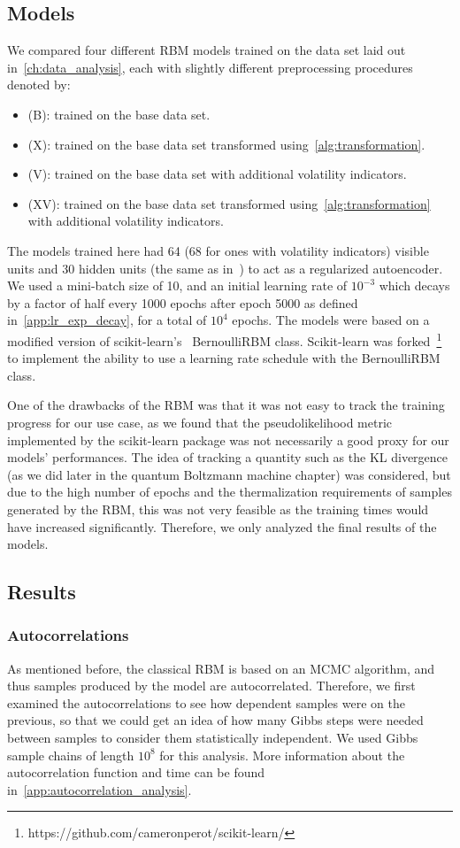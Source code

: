 \subsection{Models}
We compared four different RBM models trained on the data set laid out in~\cref{ch:data_analysis}, each with slightly different preprocessing procedures denoted by:
\begin{itemize}
    \item (B): trained on the base data set.
    \item (X): trained on the base data set transformed using~\cref{alg:transformation}.
    \item (V): trained on the base data set with additional volatility indicators.
    \item (XV): trained on the base data set transformed using~\cref{alg:transformation} with additional volatility indicators.
\end{itemize}
The models trained here had 64 (68 for ones with volatility indicators) visible units and 30 hidden units (the same as in~\cite{kondratyev_2019}) to act as a regularized autoencoder.
We used a mini-batch size of 10, and an initial learning rate of \( 10^{-3} \) which decays by a factor of half every 1000 epochs after epoch 5000 as defined in~\cref{app:lr_exp_decay}, for a total of \( 10^4 \) epochs.
The models were based on a modified version of scikit-learn's~\cite{python_sklearn} BernoulliRBM class.
Scikit-learn was forked~\footnote{https://github.com/cameronperot/scikit-learn/} to implement the ability to use a learning rate schedule with the BernoulliRBM class.

One of the drawbacks of the RBM was that it was not easy to track the training progress for our use case, as we found that the pseudolikelihood metric implemented by the scikit-learn package was not necessarily a good proxy for our models' performances.
The idea of tracking a quantity such as the KL divergence (as we did later in the quantum Boltzmann machine chapter) was considered, but due to the high number of epochs and the thermalization requirements of samples generated by the RBM, this was not very feasible as the training times would have increased significantly.
Therefore, we only analyzed the final results of the models.

\subsection{Results}
\subsubsection{Autocorrelations}
As mentioned before, the classical RBM is based on an MCMC algorithm, and thus samples produced by the model are autocorrelated.
Therefore, we first examined the autocorrelations to see how dependent samples were on the previous, so that we could get an idea of how many Gibbs steps were needed between samples to consider them statistically independent.
We used Gibbs sample chains of length \( 10^8 \) for this analysis.
More information about the autocorrelation function and time can be found in~\cref{app:autocorrelation_analysis}.

